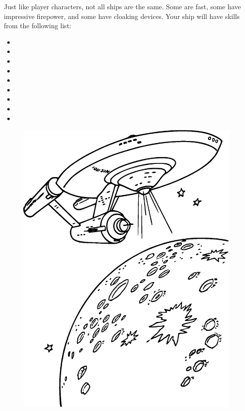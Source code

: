 \documentclass[12pt,titlepage,openany]{book}
\begin{document}
Just like player characters, not all ships are the same. Some are fast, some
have impressive firepower, and some have cloaking devices. Your ship will have
skills from the following list:

\begin{multicols}{3}
    \raggedcolumns
    \begin{itemize}
        \item {}
        \item {}
        \item {}
        \item {}
        \item {}
        \item {}
        \item {}
        \item {}
        \item {}
    \end{itemize}
\end{multicols}

\begin{figure}
    \centering
    \includegraphics[width=0.8\linewidth]{img/StarshipPlanet.eps}\\
\end{figure}
\end{document}
